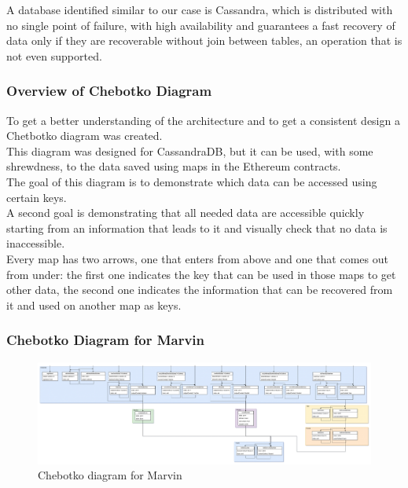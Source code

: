 \documentclass[ManualeSviluppatore]{subfiles}
\begin{document}
A database identified similar to our case is Cassandra, which is distributed with no single point of failure, with high availability and guarantees a fast recovery of data only if they are recoverable without join between tables, an operation that is not even supported.\\

\subsubsection{Overview of Chebotko Diagram}
To get a better understanding of the architecture and to get a consistent design a Chetbotko diagram was created.\\
This diagram was designed for CassandraDB, but it can be used, with some shrewdness, to the data saved using maps in the Ethereum contracts.\\
The goal of this diagram is to demonstrate which data can be accessed using certain keys.\\
A second goal is demonstrating that all needed data are accessible quickly starting from an information that leads to it and visually check that no data is inaccessible.\\
Every map has two arrows, one that enters from above and one that comes out from under: the first one indicates the key that can be used in those maps to get other data, the second one indicates the information that can be recovered from it and used on another map as keys.\\

\begin{landscape}
\newpage
\subsubsection{Chebotko Diagram for Marvin}
\begin{figure}[h]
	\centering
	\includegraphics[width=1\linewidth]{"diagrammi/Chebotko Diagram"}
	\caption{Chebotko diagram for Marvin}
	\label{fig:Chebotko diagram for Marvin}
\end{figure}
\end{landscape}
\newpage
\end{document}
